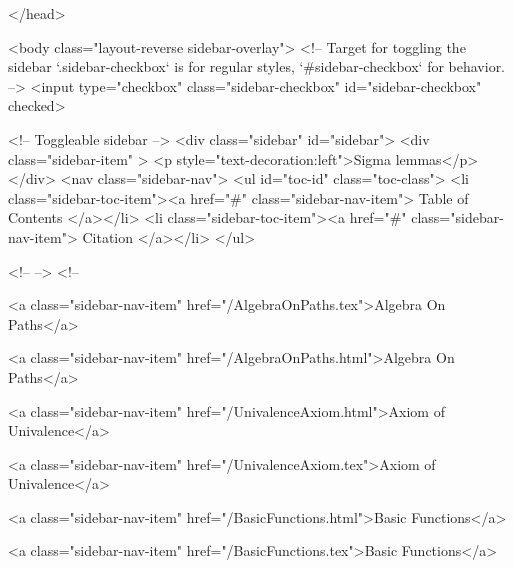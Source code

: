   
</head>




  <body class="layout-reverse sidebar-overlay">
    <!-- Target for toggling the sidebar `.sidebar-checkbox` is for regular
     styles, `#sidebar-checkbox` for behavior. -->
<input type="checkbox" class="sidebar-checkbox" id="sidebar-checkbox" checked>

<!-- Toggleable sidebar -->
<div class="sidebar" id="sidebar">
  <div class="sidebar-item" >
    <p style="text-decoration:left">Sigma lemmas</p>
  </div>
  <nav class="sidebar-nav">
    <ul id="toc-id" class="toc-class">
  <li class="sidebar-toc-item"><a href="#" class="sidebar-nav-item"> Table of Contents </a></li>
  <li class="sidebar-toc-item"><a href="#" class="sidebar-nav-item"> Citation </a></li>
</ul>


    <!--  -->
    <!-- 
      
    
      
    
      
    
      
        
      
    
      
        
          <a class="sidebar-nav-item" href="/AlgebraOnPaths.tex">Algebra On Paths</a>
        
      
    
      
        
          <a class="sidebar-nav-item" href="/AlgebraOnPaths.html">Algebra On Paths</a>
        
      
    
      
        
          <a class="sidebar-nav-item" href="/UnivalenceAxiom.html">Axiom of Univalence</a>
        
      
    
      
        
          <a class="sidebar-nav-item" href="/UnivalenceAxiom.tex">Axiom of Univalence</a>
        
      
    
      
        
          <a class="sidebar-nav-item" href="/BasicFunctions.html">Basic Functions</a>
        
      
    
      
        
          <a class="sidebar-nav-item" href="/BasicFunctions.tex">Basic Functions</a>
        
      
    
